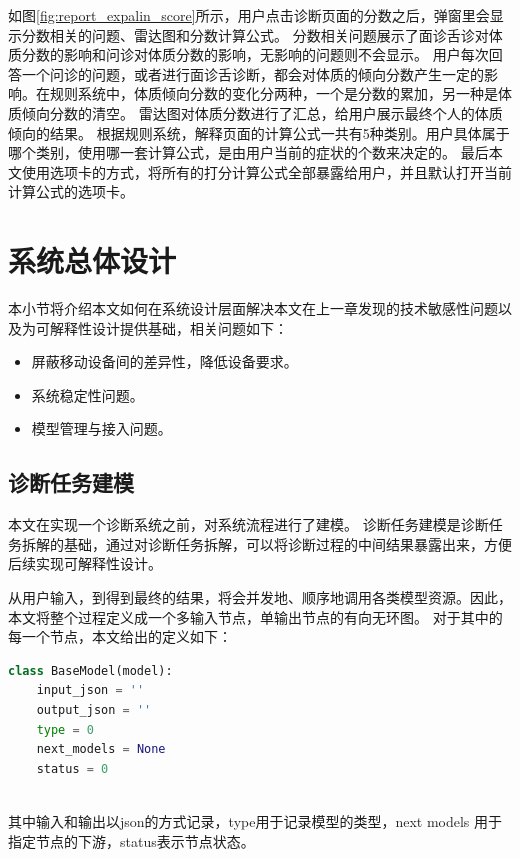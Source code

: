 如图\ref{fig:report_expalin_score}所示，用户点击诊断页面的分数之后，弹窗里会显示分数相关的问题、雷达图和分数计算公式。
分数相关问题展示了面诊舌诊对体质分数的影响和问诊对体质分数的影响，无影响的问题则不会显示。
用户每次回答一个问诊的问题，或者进行面诊舌诊断，都会对体质的倾向分数产生一定的影响。在规则系统中，体质倾向分数的变化分两种，一个是分数的累加，另一种是体质倾向分数的清空。
雷达图对体质分数进行了汇总，给用户展示最终个人的体质倾向的结果。
根据规则系统，解释页面的计算公式一共有5种类别。用户具体属于哪个类别，使用哪一套计算公式，是由用户当前的症状的个数来决定的。
最后本文使用选项卡的方式，将所有的打分计算公式全部暴露给用户，并且默认打开当前计算公式的选项卡。


\section{系统总体设计}

本小节将介绍本文如何在系统设计层面解决本文在上一章发现的技术敏感性问题以及为可解释性设计提供基础，相关问题如下：
\begin{itemize}
    \item 屏蔽移动设备间的差异性，降低设备要求。
    \item 系统稳定性问题。
    \item 模型管理与接入问题。
\end{itemize}

\subsection{诊断任务建模}
本文在实现一个诊断系统之前，对系统流程进行了建模。
诊断任务建模是诊断任务拆解的基础，通过对诊断任务拆解，可以将诊断过程的中间结果暴露出来，方便后续实现可解释性设计。

从用户输入，到得到最终的结果，将会并发地、顺序地调用各类模型资源。因此，本文将整个过程定义成一个多输入节点，单输出节点的有向无环图。
对于其中的每一个节点，本文给出的定义如下：
\begin{lstlisting}[language={Python}, title=model.py]
class BaseModel(model):
    input_json = ''
    output_json = ''
    type = 0
    next_models = None
    status = 0
    
\end{lstlisting}

其中输入和输出以json的方式记录，type用于记录模型的类型，next models 用于指定节点的下游，status表示节点状态。


